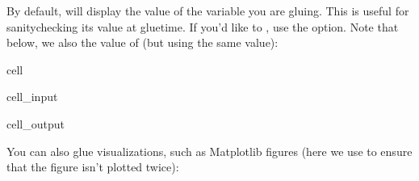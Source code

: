 \documentclass[letterpaper,10pt,english]{jupyterBook}
\begin{document}
\sphinxAtStartPar
By default,  will display the value of the variable you are gluing. This
is useful for sanity\sphinxhyphen{}checking its value at glue\sphinxhyphen{}time. If you’d like to ,
use the  option. Note that below, we also  the value of
 (but using the same value):

\begin{sphinxuseclass}{cell}\begin{sphinxVerbatimInput}

\begin{sphinxuseclass}{cell_input}
\begin{sphinxVerbatim}[commandchars=\\\{\}]
  
\end{sphinxVerbatim}

\end{sphinxuseclass}\end{sphinxVerbatimInput}
\begin{sphinxVerbatimOutput}

\begin{sphinxuseclass}{cell_output}
\end{sphinxuseclass}\end{sphinxVerbatimOutput}

\end{sphinxuseclass}
\sphinxAtStartPar
You can also glue visualizations, such as Matplotlib figures (here we use  to ensure that the figure isn’t plotted twice):
\end{document}
